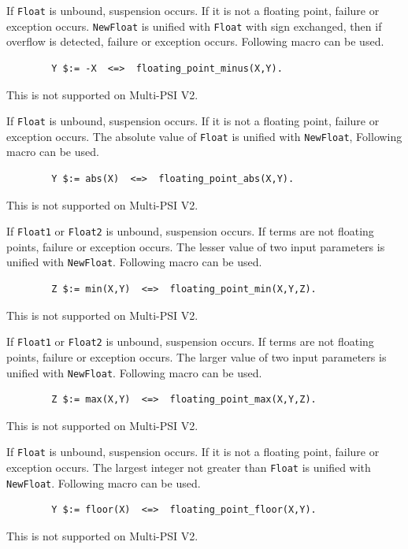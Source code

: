 \begin{itemize}
\index{\verb|/|}
If \verb|Float| is unbound, suspension occurs.
If it is not a floating point, failure or exception occurs.
\verb|NewFloat| is unified with \verb|Float| with sign exchanged, then
if overflow is detected, failure or exception occurs.
Following macro can be used.
\begin{verbatim}
        Y $:= -X  <=>  floating_point_minus(X,Y).
\end{verbatim}
\Caution This is not supported on Multi-PSI V2.

\index{\verb|-|}
If \verb|Float| is unbound, suspension occurs.
If it is not a floating point, failure or exception occurs.
The absolute value of \verb|Float| is unified with \verb|NewFloat|,
Following macro can be used.
\begin{verbatim}
        Y $:= abs(X)  <=>  floating_point_abs(X,Y).
\end{verbatim}
\Caution This is not supported on Multi-PSI V2.

If \verb|Float1| or \verb|Float2| is unbound, suspension occurs.
If terms are not floating points, failure or exception occurs.
The lesser value of two input parameters is unified with \verb|NewFloat|.
Following macro can be used.
\begin{verbatim}
        Z $:= min(X,Y)  <=>  floating_point_min(X,Y,Z).
\end{verbatim}
\Caution This is not supported on Multi-PSI V2.

If \verb|Float1| or \verb|Float2| is unbound, suspension occurs.
If terms are not floating points, failure or exception occurs.
The larger value of two input parameters is unified with \verb|NewFloat|.
Following macro can be used.
\begin{verbatim}
        Z $:= max(X,Y)  <=>  floating_point_max(X,Y,Z).
\end{verbatim}
\Caution This is not supported on Multi-PSI V2.

If \verb|Float| is unbound, suspension occurs.
If it is not a floating point, failure or exception occurs.
The largest integer not greater than \verb|Float| is unified with 
\verb|NewFloat|.
Following macro can be used.
\begin{verbatim}
        Y $:= floor(X)  <=>  floating_point_floor(X,Y).
\end{verbatim}
\Caution This is not supported on Multi-PSI V2.


\end{itemize}
